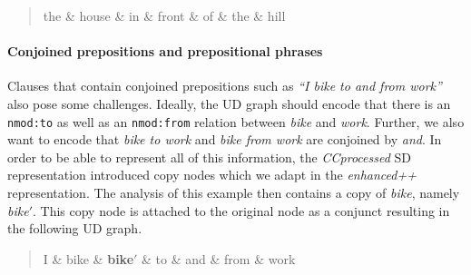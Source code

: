 \documentclass[10pt, a4paper]{article}
\begin{document}
\begin{quote}
\begin{center}
\begin{dependency}[column sep=0.2em, edge unit distance=2.25ex]
  \begin{deptext}
    the \& house \& in \& front \& of \& the \& hill \\
  \end{deptext}
\end{dependency}
\end{center}
\end{quote}




\paragraph{Conjoined prepositions and prepositional phrases} 
Clauses that contain conjoined prepositions such as \textit{``I bike to and from work''}
also pose some challenges. Ideally, the UD graph should encode 
that there is an \texttt{nmod:to} as well as an \texttt{nmod:from} 
relation between \textit{bike} and \textit{work}. Further, we also 
want to encode that \textit{bike to work} and \textit{bike from work} 
are conjoined by \textit{and}. In order to be able to represent all of this information, 
the \textit{CCprocessed} SD representation introduced copy nodes which 
we adapt in the \textit{enhanced++} representation. 
The analysis of this example then contains a copy of \textit{bike}, 
namely \textit{bike$'$}. This copy node is attached to the original node as 
a conjunct resulting in the following UD graph.


\begin{quote}
\begin{center}
\begin{dependency}[column sep=0.2em, edge unit distance=2.25ex]
  \begin{deptext}
    I \& bike \& \textbf{bike$'$} \& to \& and \& from \& work \\
  \end{deptext}
\end{dependency}
\end{center}
\end{quote}
\end{document}

